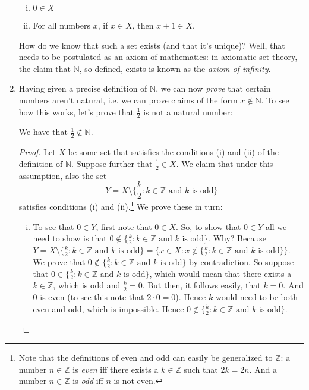 \begin{enumerate}[{\thesection}.1]
\begin{enumerate}[(i)]
		\item $0\in X$
		
		\item For all numbers $x$, if $x\in X$, then $x+1\in X$.
	
	\end{enumerate}
How do we know that such a set exists (and that it's unique)? Well, that needs to be postulated as an axiom of mathematics: in axiomatic set theory, the claim that $\mathbb{N}$, so defined, exists is known as the \emph{axiom of infinity}.

	\item Having given a precise definition of $\mathbb{N}$, we can now \emph{prove} that certain numbers aren't natural, i.e. we can prove claims of the form $x\notin\mathbb{N}$. To see how this works, let's prove that $\frac{1}{2}$ is not a natural number:
	
		\begin{proposition}
		We have that $\frac{1}{2}\notin \mathbb{N}$.
		\end{proposition} 
		\begin{proof}
		Let $X$ be some set that satisfies the conditions (i) and (ii) of the definition of $\mathbb{N}$. Suppose further that $\frac{1}{2}\in X$. We claim that under this assumption, also the set \[Y=X\setminus \{\frac{k}{2}: k\in \mathbb{Z}\text{ and }k\text{ is odd}\}\] satisfies conditions (i) and (ii).\footnote{Note that the definitions of even and odd can easily be generalized to $\mathbb{Z}$: a number $n\in\mathbb{Z}$ is \emph{even} iff there exists a $k\in\mathbb{Z}$ such that $2k=2n$. And a number $n\in\mathbb{Z}$ is \emph{odd} iff $n$ is not even.}	We prove these in turn:
		\begin{enumerate}[(i)]
	
		\item To see that $0\in Y$, first note that $0\in X$. So, to show that $0\in Y$ all we need to show is that $0\notin \{\frac{k}{2}: k\in \mathbb{Z}\text{ and }k\text{ is odd}\}$. Why? Because $Y=X\setminus  \{\frac{k}{2}: k\in \mathbb{Z}\text{ and }k\text{ is odd}\}=\{x\in X: x\notin  \{\frac{k}{2}: k\in \mathbb{Z}\text{ and }k\text{ is odd}\}\}$. We prove that $0\notin \{\frac{k}{2}: k\in \mathbb{Z}\text{ and }k\text{ is odd}\}$ by contradiction. So suppose that $0\in \{\frac{k}{2}: k\in \mathbb{Z}\text{ and }k\text{ is odd}\}$, which would mean that there exists a $k\in\mathbb{Z}$, which is odd and $\frac{k}{2}=0$. But then, it follows easily, that $k=0$. And $0$ is even (to see this note that $2\cdot 0=0$). Hence $k$ would need to be both even and odd, which is impossible. Hence $0\notin \{\frac{k}{2}: k\in \mathbb{Z}\text{ and }k\text{ is odd}\}$.
		

\end{enumerate}
\end{proof}
\end{enumerate}
